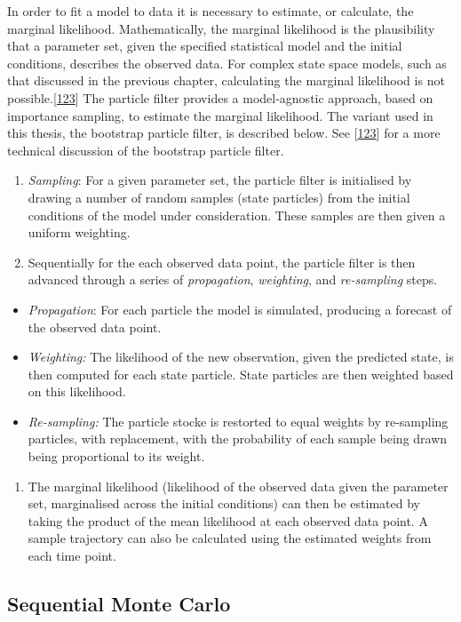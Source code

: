 \documentclass[11pt,twoside]{bristolthesis}
\providecommand{\tightlist}{%
  \setlength{\itemsep}{0pt}\setlength{\parskip}{0pt}}
\begin{document}
  In order to fit a model to data it is necessary to estimate, or calculate, the marginal likelihood. Mathematically, the marginal likelihood is the plausibility that a parameter set, given the specified statistical model and the initial conditions, describes the observed data. For complex state space models, such as that discussed in the previous chapter, calculating the marginal likelihood is not possible.{[}\protect\hyperlink{ref-Murray2015}{123}{]} The particle filter provides a model-agnostic approach, based on importance sampling, to estimate the marginal likelihood. The variant used in this thesis, the bootstrap particle filter, is described below. See {[}\protect\hyperlink{ref-Murray2015}{123}{]} for a more technical discussion of the bootstrap particle filter.
  \begin{enumerate}
  \def\labelenumi{\arabic{enumi}.}
  \item
    \emph{Sampling}: For a given parameter set, the particle filter is initialised by drawing a number of random samples (state particles) from the initial conditions of the model under consideration. These samples are then given a uniform weighting.
  \item
    Sequentially for the each observed data point, the particle filter is then advanced through a series of \emph{propagation}, \emph{weighting}, and \emph{re-sampling} steps.
  \end{enumerate}
  \begin{itemize}
  \item
    \emph{Propagation}: For each particle the model is simulated, producing a forecast of the observed data point.
  \item
    \emph{Weighting:} The likelihood of the new observation, given the predicted state, is then computed for each state particle. State particles are then weighted based on this likelihood.
  \item
    \emph{Re-sampling:} The particle stocke is restorted to equal weights by re-sampling particles, with replacement, with the probability of each sample being drawn being proportional to its weight.
  \end{itemize}
  \begin{enumerate}
  \def\labelenumi{\arabic{enumi}.}
  \setcounter{enumi}{2}
  \tightlist
  \item
    The marginal likelihood (likelihood of the observed data given the parameter set, marginalised across the initial conditions) can then be estimated by taking the product of the mean likelihood at each observed data point. A sample trajectory can also be calculated using the estimated weights from each time point.
  \end{enumerate}
  \hypertarget{sequential-monte-carlo}{%
  \subsection{Sequential Monte Carlo}\label{sequential-monte-carlo}}
  
\end{document}
